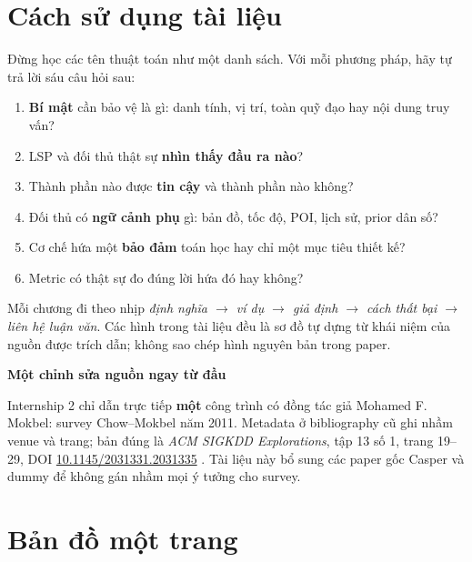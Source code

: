 \documentclass[11pt,a4paper,oneside]{report}
\newenvironment{warningbox}[1][Cẩn thận]{%
  \par\medskip\noindent\begin{lrbox}{\warningstore}\begin{minipage}{.89\textwidth}
  {\sffamily\bfseries\color{red}#1}\par\smallskip}{%
  \end{minipage}\end{lrbox}\begin{center}\setlength{\fboxsep}{7pt}%
  \fcolorbox{red}{lightred}{\usebox{\warningstore}}\end{center}\medskip}
\begin{document}
\hypersetup{pageanchor=true}

\chapter*{Cách sử dụng tài liệu}

Đừng học các tên thuật toán như một danh sách. Với mỗi phương pháp, hãy tự trả lời
sáu câu hỏi sau:

\begin{enumerate}
  \item \textbf{Bí mật} cần bảo vệ là gì: danh tính, vị trí, toàn quỹ đạo hay nội dung truy vấn?
  \item LSP và đối thủ thật sự \textbf{nhìn thấy đầu ra nào}?
  \item Thành phần nào được \textbf{tin cậy} và thành phần nào không?
  \item Đối thủ có \textbf{ngữ cảnh phụ} gì: bản đồ, tốc độ, POI, lịch sử, prior dân số?
  \item Cơ chế hứa một \textbf{bảo đảm} toán học hay chỉ một mục tiêu thiết kế?
  \item Metric có thật sự đo đúng lời hứa đó hay không?
\end{enumerate}

Mỗi chương đi theo nhịp \emph{định nghĩa $\rightarrow$ ví dụ $\rightarrow$ giả định
$\rightarrow$ cách thất bại $\rightarrow$ liên hệ luận văn}. Các hình trong tài liệu
đều là sơ đồ tự dựng từ khái niệm của nguồn được trích dẫn; không sao chép hình
nguyên bản trong paper.

\begin{warningbox}[Một chỉnh sửa nguồn ngay từ đầu]
Internship 2 chỉ dẫn trực tiếp \textbf{một} công trình có đồng tác giả Mohamed F.
Mokbel: survey Chow--Mokbel năm 2011. Metadata ở bibliography cũ ghi nhầm venue
và trang; bản đúng là \emph{ACM SIGKDD Explorations}, tập 13 số 1, trang 19--29,
DOI \href{https://doi.org/10.1145/2031331.2031335}{10.1145/2031331.2031335}
\cite{chow2011trajectory}. Tài liệu này bổ sung các paper gốc Casper và dummy để
không gán nhầm mọi ý tưởng cho survey.
\end{warningbox}

\tableofcontents
\listoffigures
\listoftables

\clearpage
\chapter*{Bản đồ một trang}
\end{document}
